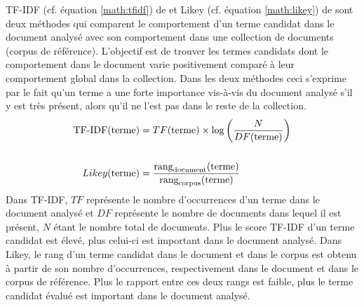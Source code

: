       TF-IDF (cf. équation \ref{math:tfidf}) de \citet{jones1972tfidf} et Likey
      (cf. équation \ref{math:likey}) de \citet{paukkeri2010likey} sont deux
      méthodes qui comparent le comportement d'un terme candidat dans le
      document analysé avec son comportement dans une collection de documents
      (corpus de référence). L'objectif est de trouver les termes candidats dont
      le comportement dans le document varie positivement comparé à leur
      comportement global dans la collection. Dans les deux méthodes ceci
      s'exprime par le fait qu'un terme a une forte importance vis-à-vis du
      document analysé s'il y est très présent, alors qu'il ne l'est pas dans le
      reste de la collection.
      \begin{align}
        \text{TF-IDF}(\text{terme}) &= TF(\text{terme}) \times \log\left(\frac{N}{DF(\text{terme})}\right) \label{math:tfidf}\\
        \notag\\
        Likey(\text{terme}) &= \frac{\text{rang}_{\text{document}}(\text{terme})}{\text{rang}_{\text{corpus}}(\text{terme})} \label{math:likey}
      \end{align}
      Dans TF-IDF, $TF$ représente le nombre d'occurrences d'un terme dans le
      document analysé et $DF$ représente le nombre de documents dans lequel il
      est présent, $N$ étant le nombre total de documents. Plus le score TF-IDF
      d'un terme candidat est élevé, plus celui-ci est important dans le
      document analysé. Dans Likey, le rang d'un terme candidat dans le document
      et dans le corpus est obtenu à partir de son nombre d'occurrences,
      respectivement dans le document et dans le corpus de référence. Plus le
      rapport entre ces deux rangs est faible, plus le terme candidat évalué est
      important dans le document analysé.

